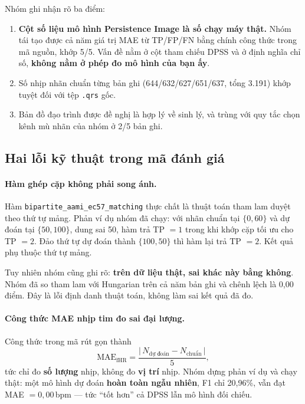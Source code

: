 \begin{ghichu}[title={Điều đúng trong gói đối chuẩn}]
Nhóm ghi nhận rõ ba điểm:
\begin{enumerate}[leftmargin=1.5em,itemsep=2pt]
\item \textbf{Cột số liệu mô hình Persistence Image là số chạy máy thật.} Nhóm tái tạo được cả năm giá
trị MAE từ TP/FP/FN bằng chính công thức trong mã nguồn, khớp 5/5. Vấn đề nằm ở cột tham chiếu DPSS và
ở định nghĩa chỉ số, \textbf{không nằm ở phép đo mô hình của bạn ấy}.
\item Số nhịp nhãn chuẩn từng bản ghi (644/632/627/651/637, tổng 3.191) khớp tuyệt đối với tệp
\texttt{.qrs} gốc.
\item Bản đồ đạo trình được đề nghị là hợp lý về sinh lý, và trùng với quy tắc chọn kênh mù nhãn của
nhóm ở 2/5 bản ghi.
\end{enumerate}
\end{ghichu}

\subsection{Hai lỗi kỹ thuật trong mã đánh giá}

\paragraph{Hàm ghép cặp không phải song ánh.} Hàm \texttt{bipartite\_aami\_ec57\_matching} thực chất là
thuật toán tham lam duyệt theo thứ tự mảng. Phản ví dụ nhóm đã chạy: với nhãn chuẩn tại
$\{0, 60\}$ và dự đoán tại $\{50, 100\}$, dung sai 50, hàm trả TP $=1$ trong khi khớp cặp tối ưu cho
TP $=2$. Đảo thứ tự dự đoán thành $\{100, 50\}$ thì hàm lại trả TP $=2$. Kết quả phụ thuộc thứ tự mảng.

Tuy nhiên nhóm cũng ghi rõ: \textbf{trên dữ liệu thật, sai khác này bằng không}. Nhóm đã so tham lam với
Hungarian trên cả năm bản ghi và chênh lệch là 0,00 điểm. Đây là lỗi định danh thuật toán, không làm sai
kết quả đã đo.

\paragraph{Công thức MAE nhịp tim đo sai đại lượng.} Công thức trong mã rút gọn thành
\[
\text{MAE}_{\text{fHR}} = \frac{\bigl|\,N_{\text{dự đoán}} - N_{\text{chuẩn}}\,\bigr|}{5},
\]
tức chỉ đo \textbf{số lượng} nhịp, không đo \textbf{vị trí} nhịp. Nhóm dựng phản ví dụ và chạy thật:
một mô hình dự đoán \textbf{hoàn toàn ngẫu nhiên}, F1 chỉ 20,96\%, vẫn đạt MAE $= 0{,}00$\,bpm --- tức
``tốt hơn'' cả DPSS lẫn mô hình đối chiếu.

